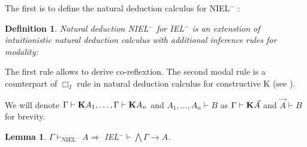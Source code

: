 \documentclass[a4paper]{article}
\newtheorem{lemma}{Lemma}
\newtheorem{defin}{Definition}
\begin{document}
  The first is to define the natural deduction calculus for NIEL$^{-}$ :

  \begin{defin} Natural deduction NIEL$^{-}$ for IEL$^{-}$ is an extenstion of intuitionistic natural deduction calculus
    with additional inference rules for modality:

  \begin{minipage}{0.5\textwidth}
    \begin{flushleft}
  	\begin{prooftree}
  \end{prooftree}
    \end{flushleft}
  \end{minipage}
  \begin{minipage}{0.5\textwidth}
    \begin{flushright}
  	\begin{prooftree}
  	\end{prooftree}
    \end{flushright}
  \end{minipage}
  \end{defin}

The first rule allows to derive co-reflextion. The second modal rule is a counterpart of $\Box_I$
rule in natural deduction calculus for constructive K (see \cite{ModalLa}).

We will denote $\Gamma \vdash {\bf K} A_1, \dots, \Gamma \vdash {\bf K} A_n$ and $A_1,\dots,A_n \vdash B$ as $\Gamma \vdash {\bf K} \vec{A}$ and $\vec{A} \vdash B$ for brevity.

  \vspace{\baselineskip}

  \begin{lemma}
    $\Gamma \vdash_{\text{NIEL}^{-}} A \Rightarrow$ IEL$^{-} \vdash \bigwedge \Gamma \rightarrow A$.
  \end{lemma}
\end{document}
